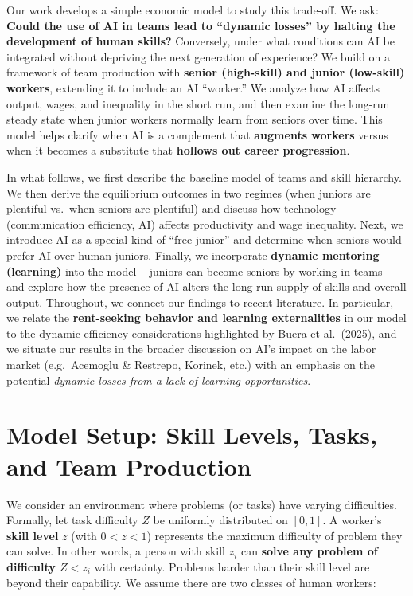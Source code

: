 \documentclass[12pt]{article}
\begin{document}
Our work develops a simple economic model to study this trade-off. We
ask: \textbf{Could the use of AI in teams lead to ``dynamic losses'' by
halting the development of human skills?} Conversely, under what
conditions can AI be integrated without depriving the next generation of
experience? We build on a framework of team production with
\textbf{senior (high-skill) and junior (low-skill) workers}, extending
it to include an AI ``worker.'' We analyze how AI affects output, wages,
and inequality in the short run, and then examine the long-run steady
state when junior workers normally learn from seniors over time. This
model helps clarify when AI is a complement that \textbf{augments
workers} versus when it becomes a substitute that \textbf{hollows out
career progression}.

In what follows, we first describe the baseline model of teams and skill
hierarchy. We then derive the equilibrium outcomes in two regimes (when
juniors are plentiful vs.~when seniors are plentiful) and discuss how
technology (communication efficiency, AI) affects productivity and wage
inequality. Next, we introduce AI as a special kind of ``free junior''
and determine when seniors would prefer AI over human juniors. Finally,
we incorporate \textbf{dynamic mentoring (learning)} into the model --
juniors can become seniors by working in teams -- and explore how the
presence of AI alters the long-run supply of skills and overall output.
Throughout, we connect our findings to recent literature. In particular,
we relate the \textbf{rent-seeking behavior and learning externalities}
in our model to the dynamic efficiency considerations highlighted by
Buera et al.~(2025), and we situate our results in the broader
discussion on AI's impact on the labor market (e.g.~Acemoglu \&
Restrepo, Korinek, etc.) with an emphasis on the potential \emph{dynamic
losses from a lack of learning opportunities}.

\section{Model Setup: Skill Levels, Tasks, and Team
Production}\label{model-setup-skill-levels-tasks-and-team-production}

We consider an environment where problems (or tasks) have varying
difficulties. Formally, let task difficulty \(Z\) be uniformly
distributed on \([0,1]\). A worker's \textbf{skill level} \(z\) (with
\(0<z<1\)) represents the maximum difficulty of problem they can solve.
In other words, a person with skill \(z_i\) can \textbf{solve any
problem of difficulty \(Z < z_i\)} with certainty. Problems harder than
their skill level are beyond their capability. We assume there are two
classes of human workers:
\end{document}

